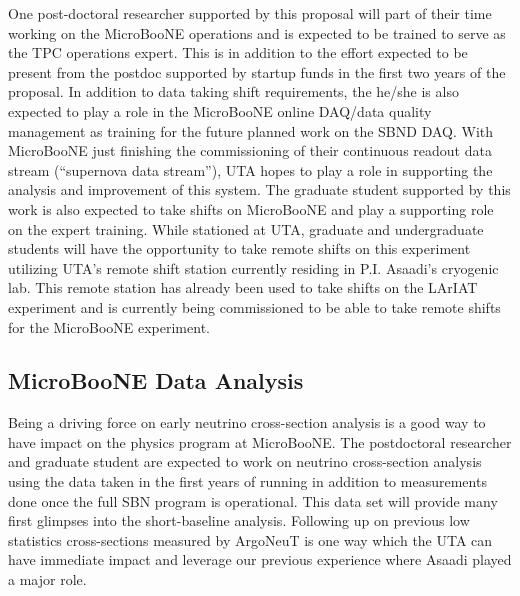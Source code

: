 One post-doctoral researcher supported by this proposal will part of their time working on the MicroBooNE operations and is expected to be trained to serve as the TPC operations expert. This is in addition to the effort expected to be present from the postdoc supported by startup funds in the first two years of the proposal. In addition to data taking shift requirements, the he/she is also expected to play a role in the MicroBooNE online DAQ/data quality management as training for the future planned work on the SBND DAQ. With MicroBooNE just finishing the commissioning of their continuous readout data stream (``supernova data stream''), UTA hopes to play a role in supporting the analysis and improvement of this system. The graduate student supported by this work is also expected to take shifts on MicroBooNE and play a supporting role on the expert training. While stationed at UTA, graduate and undergraduate students will have the opportunity to take remote shifts on this experiment utilizing UTA's remote shift station currently residing in P.I. Asaadi's cryogenic lab. This remote station has already been used to take shifts on the LArIAT experiment and is currently being commissioned to be able to take remote shifts for the MicroBooNE experiment. 



\subsection{MicroBooNE Data Analysis}\label{sec:UbooneDataAnalysis}
Being a driving force on early neutrino cross-section analysis is a good way to have impact on the physics program at MicroBooNE. The postdoctoral researcher and graduate student are expected to work on neutrino cross-section analysis using the data taken in the first years of running in addition to measurements done once the full SBN program is operational. This data set will provide many first glimpses into the short-baseline analysis. Following up on previous low statistics cross-sections measured by ArgoNeuT is one way which the UTA can have immediate impact and leverage our previous experience where Asaadi played a major role. 

